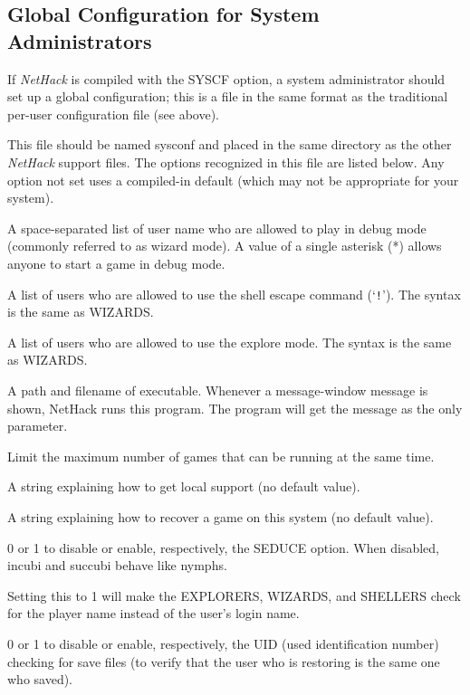\documentclass[titlepage]{article}
\begin{document}
\subsection*{Global Configuration for System Administrators}

If \textit{NetHack} is compiled with the SYSCF option, a system administrator
should set up a global configuration; this is a file in the
same format as the traditional per-user configuration file (see above).

This file should be named sysconf and placed in the same directory as
the other \textit{NetHack} support files.
The options recognized in this file are listed below. Any option not
set uses a compiled-in default (which may not be appropriate for your
system).

\begin{description}[font=\mdseries\itshape]
\item[WIZARDS]
A space-separated list of user name who are allowed to
play in debug mode (commonly referred to as wizard mode).
A value of a single
asterisk (*) allows anyone to start a game in debug mode.
\item[SHELLERS]
A list of users who are allowed to use the shell escape command (`\texttt{!}').
The syntax is the same as WIZARDS.
\item[EXPLORERS]
A list of users who are allowed to use the explore mode.
The syntax is the same as WIZARDS.
\item[MSGHANDLER]
A path and filename of executable.  Whenever a message-window
message is shown, NetHack runs this program.  The program will get
the message as the only parameter.
\item[MAXPLAYERS]
Limit the maximum number of games that can be running at the same time.
\item[SUPPORT]
A string explaining how to get local support (no default value).
\item[RECOVER]
A string explaining how to recover a game on this system (no default value).
\item[SEDUCE]
0 or 1 to disable or enable, respectively, the SEDUCE option.
When disabled, incubi and succubi behave like nymphs.
\item[CHECK\textunderscore PLNAME]
Setting this to 1 will make the EXPLORERS, WIZARDS, and SHELLERS check
for the player name instead of the user's login name.
\item[CHECK\textunderscore SAVE\textunderscore UID]
0 or 1 to disable or enable, respectively, the UID
(used identification number) checking for save files (to verify that the
user who is restoring is the same one who saved).
\end{description}
\end{document}
